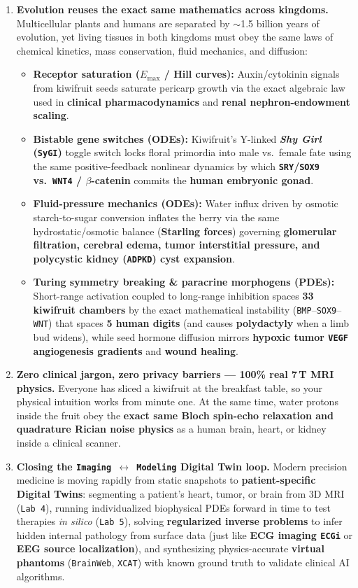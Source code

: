 \documentclass[10pt,a4paper]{article}
\begin{document}
\begin{enumerate}
    \item \textbf{Evolution reuses the exact same mathematics across kingdoms.} Multicellular plants and humans are separated by $\sim$1.5 billion years of evolution, yet living tissues in both kingdoms must obey the same laws of chemical kinetics, mass conservation, fluid mechanics, and diffusion:
    \begin{itemize}
        \item \textbf{Receptor saturation ($E_{\max}$ / Hill curves):} Auxin/cytokinin signals from kiwifruit seeds saturate pericarp growth via the exact algebraic law used in \textbf{clinical pharmacodynamics} and \textbf{renal nephron-endowment scaling}.
        \item \textbf{Bistable gene switches (ODEs):} Kiwifruit's Y-linked \textbf{\textit{Shy Girl} (\texttt{SyGI})} toggle switch locks floral primordia into male vs.\ female fate using the same positive-feedback nonlinear dynamics by which \textbf{\texttt{SRY}/\texttt{SOX9} vs.\ \texttt{WNT4} / $\beta$-catenin} commits the \textbf{human embryonic gonad}.
        \item \textbf{Fluid-pressure mechanics (ODEs):} Water influx driven by osmotic starch-to-sugar conversion inflates the berry via the same hydrostatic/osmotic balance (\textbf{Starling forces}) governing \textbf{glomerular filtration, cerebral edema, tumor interstitial pressure, and polycystic kidney (\texttt{ADPKD}) cyst expansion}.
        \item \textbf{Turing symmetry breaking \& paracrine morphogens (PDEs):} Short-range activation coupled to long-range inhibition spaces \textbf{33 kiwifruit chambers} by the exact mathematical instability (\texttt{BMP}--\texttt{SOX9}--\texttt{WNT}) that spaces \textbf{5 human digits} (and causes \textbf{polydactyly} when a limb bud widens), while seed hormone diffusion mirrors \textbf{hypoxic tumor \texttt{VEGF} angiogenesis gradients} and \textbf{wound healing}.
    \end{itemize}
    \item \textbf{Zero clinical jargon, zero privacy barriers --- 100\% real 7\,T MRI physics.} Everyone has sliced a kiwifruit at the breakfast table, so your physical intuition works from minute one. At the same time, water protons inside the fruit obey the \textbf{exact same Bloch spin-echo relaxation and quadrature Rician noise physics} as a human brain, heart, or kidney inside a clinical scanner.
    \item \textbf{Closing the \texttt{Imaging $\leftrightarrow$ Modeling} Digital Twin loop.} Modern precision medicine is moving rapidly from static snapshots to \textbf{patient-specific Digital Twins}: segmenting a patient's heart, tumor, or brain from 3D MRI (\texttt{Lab 4}), running individualized biophysical PDEs forward in time to test therapies \textit{in silico} (\texttt{Lab 5}), solving \textbf{regularized inverse problems} to infer hidden internal pathology from surface data (just like \textbf{ECG imaging \texttt{ECGi}} or \textbf{EEG source localization}), and synthesizing physics-accurate \textbf{virtual phantoms} (\texttt{BrainWeb}, \texttt{XCAT}) with known ground truth to validate clinical AI algorithms.

\end{enumerate}
\end{document}
